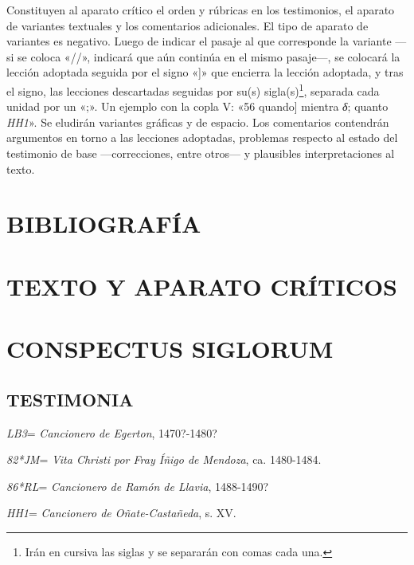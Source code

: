 \documentclass[11pt,a4paper,twoside]{article}
\newcommand{\comillas}[1]{«#1»}
\begin{document}
Constituyen al aparato crítico el orden y rúbricas en los testimonios, el aparato de variantes textuales y los comentarios adicionales. El tipo de aparato de variantes es negativo. Luego de indicar el pasaje al que corresponde la variante —si se coloca \comillas{//}, indicará que aún continúa en el mismo pasaje—, se colocará la lección adoptada seguida por el signo \comillas{]} que encierra la lección adoptada, y tras el signo, las lecciones descartadas seguidas por su(s) sigla(s)\footnote{Irán en cursiva las siglas y se separarán con comas cada una.}, separada cada unidad por un \comillas{;}. Un ejemplo con la copla V: \comillas{56 quando] mientra \textit{δ}; quanto \textit{HH1}}. Se eludirán variantes gráficas y de espacio. Los comentarios contendrán argumentos en torno a las lecciones adoptadas, problemas respecto al estado del testimonio de base —correcciones, entre otros— y plausibles interpretaciones al texto.

\section*{{\fontsize{14}{14.35}\selectfont BIBLIOGRAFÍA}}
\nocite{*}
\printbibliography[heading=none]
\newpage

\section*{\raggedleft TEXTO Y APARATO CRÍTICOS}
\newpage

\section*{{\fontsize{14}{14.35}\selectfont CONSPECTUS SIGLORUM}}

\subsection*{{\fontsize{11}{11.96}\selectfont TESTIMONIA}}

\textit{LB3}= \textit{Cancionero de Egerton}, 1470?-1480?

\textit{82*JM}= \textit{Vita Christi por Fray Íñigo de Mendoza}, ca. 1480-1484.

\textit{86*RL}= \textit{Cancionero de Ramón de Llavia}, 1488-1490?

\textit{HH1}= \textit{Cancionero de Oñate-Castañeda}, s. XV.
\end{document}
